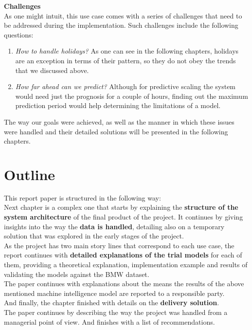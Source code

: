 \textbf{Challenges}\\
    As one might intuit, this use case comes with a series of challenges that need to be addressed during the implementation. Such challenges include the following questions: 
    \begin{enumerate}
        \item\emph{How to handle holidays?} As one can see in the following chapters, holidays are an exception in terms of their pattern, so they do not obey the trends that we discussed above.
 	    \item\emph{How far ahead can we predict?} Although for predictive scaling the system would need just the prognosis for a couple of hours, finding out the maximum prediction period  would help determining the limitations of a model.
 	\end{enumerate}
 	The way our goals were achieved, as well as the manner in which these issues were handled and their detailed solutions will be presented in the following chapters.
 	
 	
\section{Outline}
    This report paper is structured in the following way: \\
    Next chapter is a complex one that starts by explaining the \textbf{structure of the system architecture} of the final product of the project. It continues by giving insights into the way the \textbf{data is handled}, detailing also on a temporary solution that was explored in the early stages of the project.\\
    As the project has two main story lines that correspond to each use case, the report continues with \textbf{detailed explanations of the trial models} for each of them, providing a theoretical explanation, implementation example and results of validating the models against the BMW dataset.\\
    The paper continues with explanations about the means the results of the above mentioned machine intelligence model are reported to a responsible party.\\
    And finally, the chapter finished with details on the \textbf{delivery solution}.\\
    The paper continues by describing the way the project was handled from a managerial point of view. And finishes with a list of recommendations.